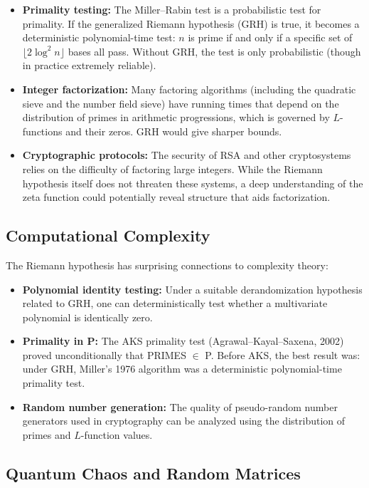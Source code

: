 \begin{itemize}
  \item \textbf{Primality testing:} The Miller--Rabin test is a probabilistic test for primality. If the generalized Riemann hypothesis (GRH) is true, it becomes a deterministic polynomial-time test: $n$ is prime if and only if a specific set of $\lfloor 2\log^2 n \rfloor$ bases all pass. Without GRH, the test is only probabilistic (though in practice extremely reliable).
  \item \textbf{Integer factorization:} Many factoring algorithms (including the quadratic sieve and the number field sieve) have running times that depend on the distribution of primes in arithmetic progressions, which is governed by $L$-functions and their zeros. GRH would give sharper bounds.
  \item \textbf{Cryptographic protocols:} The security of RSA and other cryptosystems relies on the difficulty of factoring large integers. While the Riemann hypothesis itself does not threaten these systems, a deep understanding of the zeta function could potentially reveal structure that aids factorization.
\end{itemize}

\subsection{Computational Complexity}

The Riemann hypothesis has surprising connections to complexity theory:

\begin{itemize}
  \item \textbf{Polynomial identity testing:} Under a suitable derandomization hypothesis related to GRH, one can deterministically test whether a multivariate polynomial is identically zero.
  \item \textbf{Primality in P:} The AKS primality test (Agrawal--Kayal--Saxena, 2002) proved unconditionally that PRIMES $\in$ P. Before AKS, the best result was: under GRH, Miller's 1976 algorithm was a deterministic polynomial-time primality test.
  \item \textbf{Random number generation:} The quality of pseudo-random number generators used in cryptography can be analyzed using the distribution of primes and $L$-function values.
\end{itemize}

\subsection{Quantum Chaos and Random Matrices}

